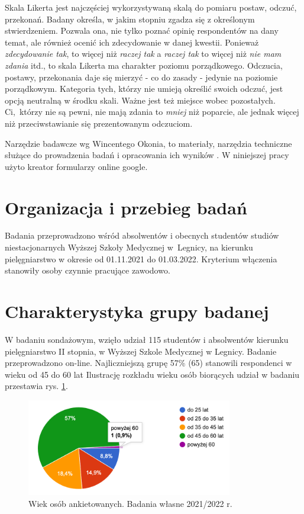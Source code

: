 \documentclass[a4paper,12pt,twoside,openright]{mwrep}
\begin{document}
Skala Likerta jest najczęściej wykorzystywaną skalą do pomiaru postaw, odczuć, przekonań. Badany określa, w jakim stopniu zgadza się z określonym stwierdzeniem. Pozwala ona, nie tylko poznać opinię respondentów na dany temat, ale również ocenić ich zdecydowanie w danej kwestii. Ponieważ \textit{zdecydowanie tak}, to więcej niż \textit{raczej tak} a \textit{raczej tak} to więcej niż \textit{nie mam zdania} itd., to skala Likerta ma charakter poziomu porządkowego. Odczucia, postawy, przekonania daje się mierzyć - co do zasady - jedynie na poziomie porządkowym. Kategoria tych, którzy nie umieją określić swoich odczuć, jest opcją neutralną w środku skali. Ważne jest też miejsce wobec pozostałych. Ci,~którzy nie są pewni, nie mają zdania to \textit{mniej} niż poparcie, ale jednak więcej niż przeciwstawianie się prezentowanym odczuciom.

Narzędzie badawcze wg Wincentego Okonia, to materiały, narzędzia techniczne służące do prowadzenia badań i opracowania ich wyników \cite{winc}. W niniejszej pracy użyto kreator formularzy online google.


\section{Organizacja i przebieg badań}
Badania przeprowadzono wśród absolwentów i obecnych studentów studiów niestacjonarnych Wyższej Szkoły Medycznej w~Legnicy, na kierunku pielęgniarstwo w okresie od 01.11.2021 do 01.03.2022. Kryterium włączenia stanowiły osoby czynnie pracujące zawodowo. 


\section{Charakterystyka grupy badanej}


W badaniu sondażowym, wzięło udział 115  studentów  i absolwentów  kierunku pielęgniarstwo II stopnia, w Wyższej Szkole Medycznej w Legnicy. Badanie przeprowadzono on-line.  Najliczniejszą grupę 57\%  (65) stanowili respondenci w wieku od 45 do 60 lat 
Ilustrację rozkładu wieku osób biorących udział w badaniu przestawia rys. \ref{rys:wiek}.

\begin{figure}[H]
\centering
\includegraphics[width=9cm]{char_gr_bad/wiek00}
\caption{Wiek osób ankietowanych. Badania własne 2021/2022 r.}
\label{rys:wiek}
\end{figure}
\end{document}
